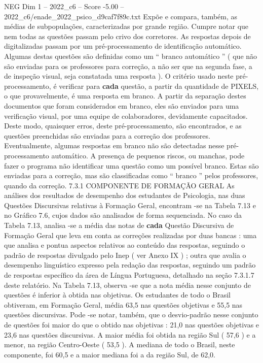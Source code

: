\begin{textsample}{NEG Dim 1 – 2022\_c6 – Score -5.00 – 2022\_c6/enade\_2022\_psico\_d9caf7f89c.txt}
Expõe e compara, também, as médias de subpopulações, caracterizadas por grande região.
Cumpre notar que nem todas as questões passam pelo crivo dos corretores.
As respostas depois de digitalizadas passam por um pré-processamento de identificação automático.
Algumas destas questões são definidas como um “ branco automático ” ( que não são enviadas para os professores para correção, a não ser que na segunda fase, a de inspeção visual, seja constatada uma resposta ).
O critério usado neste pré-processamento, é verificar para \textbf{cada} questão, a partir da quantidade de PIXELS, o que provavelmente, é uma resposta em branco.
A partir da separação destes documentos que foram considerados em branco, eles são enviados para uma verificação visual, por uma equipe de colaboradores, devidamente capacitados.
Deste modo, quaisquer erros, deste pré-processamento, são encontrados, e as questões preenchidas são enviadas para a correção dos professores.
Eventualmente, algumas respostas em branco não são detectadas nesse pré-processamento automático.
A presença de pequenos riscos, ou manchas, pode fazer o programa não identificar uma questão como um possível branco.
Estas são enviadas para a correção, mas são classificadas como “ branco ” pelos professores, quando da correção. 7.3.1 COMPONENTE DE FORMAÇÃO GERAL As análises dos resultados de desempenho dos estudantes de Psicologia, nas duas Questões Discursivas relativas à Formação Geral, encontram -se na Tabela 7.13 e no Gráfico 7.6, cujos dados são analisados de forma sequenciada.
No caso da Tabela 7.13, analisa -se a média das notas de \textbf{cada} Questão Discursiva de Formação Geral que leva em conta as correções realizadas por duas bancas : uma que analisa e pontua aspectos relativos ao conteúdo das respostas, seguindo o padrão de respostas divulgado pelo Inep ( ver Anexo IX ) ; outra que avalia o desempenho linguístico expresso pela redação das respostas, seguindo um padrão de respostas específico da área de Língua Portuguesa, detalhado na seção 7.3.1.7 deste relatório.
Na Tabela 7.13, observa -se que a nota média nesse conjunto de questões é inferior à obtida nas objetivas.
Os estudantes de todo o Brasil obtiveram, em Formação Geral, média 63,5 nas questões objetivas e 55,5 nas questões discursivas.
Pode -se notar, também, que o desvio-padrão nesse conjunto de questões foi maior do que o obtido nas objetivas : 21,0 nas questões objetivas e 23,6 nas questões discursivas.
A maior média foi obtida na região Sul ( 57,6 ) e a menor, na região Centro-Oeste ( 53,5 ).
A mediana de todo o Brasil, neste componente, foi 60,5 e a maior mediana foi a da região Sul, de 62,0.

\end{textsample}
